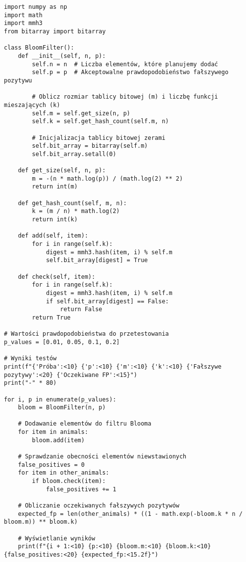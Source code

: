\documentclass{article}
\begin{document}
\begin{lstlisting}[style=pystyle, caption=Implementacja filtru Blooma]
import numpy as np
import math
import mmh3
from bitarray import bitarray

class BloomFilter():
    def __init__(self, n, p):
        self.n = n  # Liczba elementów, które planujemy dodać
        self.p = p  # Akceptowalne prawdopodobieństwo fałszywego pozytywu

        # Oblicz rozmiar tablicy bitowej (m) i liczbę funkcji mieszających (k)
        self.m = self.get_size(n, p)
        self.k = self.get_hash_count(self.m, n)

        # Inicjalizacja tablicy bitowej zerami
        self.bit_array = bitarray(self.m)
        self.bit_array.setall(0)

    def get_size(self, n, p):
        m = -(n * math.log(p)) / (math.log(2) ** 2)
        return int(m)

    def get_hash_count(self, m, n):
        k = (m / n) * math.log(2)
        return int(k)

    def add(self, item):
        for i in range(self.k):
            digest = mmh3.hash(item, i) % self.m
            self.bit_array[digest] = True

    def check(self, item):
        for i in range(self.k):
            digest = mmh3.hash(item, i) % self.m
            if self.bit_array[digest] == False:
                return False
        return True

# Wartości prawdopodobieństwa do przetestowania
p_values = [0.01, 0.05, 0.1, 0.2]

# Wyniki testów
print(f"{'Próba':<10} {'p':<10} {'m':<10} {'k':<10} {'Fałszywe pozytywy':<20} {'Oczekiwane FP':<15}")
print("-" * 80)

for i, p in enumerate(p_values):
    bloom = BloomFilter(n, p)
    
    # Dodawanie elementów do filtru Blooma
    for item in animals:
        bloom.add(item)
    
    # Sprawdzanie obecności elementów niewstawionych
    false_positives = 0
    for item in other_animals:
        if bloom.check(item):
            false_positives += 1
    
    # Obliczanie oczekiwanych fałszywych pozytywów
    expected_fp = len(other_animals) * ((1 - math.exp(-bloom.k * n / bloom.m)) ** bloom.k)
    
    # Wyświetlanie wyników
    print(f"{i + 1:<10} {p:<10} {bloom.m:<10} {bloom.k:<10} {false_positives:<20} {expected_fp:<15.2f}")
\end{lstlisting}
\end{document}
